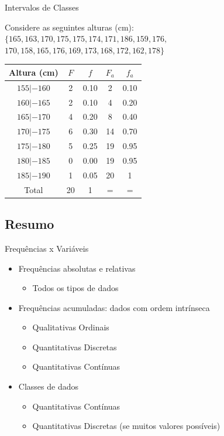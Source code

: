 \documentclass{beamer}
\begin{document}
\begin{frame}{Intervalos de Classes}

  Considere as seguintes alturas (cm):
$ \{ 165,163,170,175,175,174,171,186,159,176,$
$170,158,165,176,169,173,168,172,162,178 \} $

\centering\begin{tabular}{|c|c|c|c|c|}
  \hline
  Altura (cm) & $F$ & $f$ & $F_a$ & $f_a$ \\
  \hline
  $155 |- 160$ & 2 & 0.10 & 2 & 0.10\\%
  $160 |- 165$ & 2 & 0.10 & 4 & 0.20\\%
  $165 |- 170$ & 4 & 0.20 & 8 & 0.40\\%
  $170 |- 175$ & 6 & 0.30 & 14 & 0.70\\%
  $175 |- 180$ & 5 & 0.25 & 19 & 0.95\\%
  $180 |- 185$ & 0 & 0.00 & 19 & 0.95\\%
  $185 |- 190$ & 1 & 0.05 & 20 & 1\\%
  \hline
  \hline
  Total & 20 & 1 & = & =\\
  \hline
\end{tabular}

\end{frame}
\subsection{Resumo}

\begin{frame}{Frequências x Variáveis}
  \begin{itemize}
  \item Frequências absolutas e relativas
    \begin{itemize}
    \item Todos os tipos de dados
    \end{itemize}
  \item Frequências acumuladas: dados com ordem intrínseca
    \begin{itemize}
    \item Qualitativas Ordinais
    \item Quantitativas Discretas
    \item Quantitativas Contínuas
    \end{itemize}
  \item Classes de dados
    \begin{itemize}
    \item Quantitativas Contínuas
    \item Quantitativas Discretas (se muitos valores possíveis)
    \end{itemize}

  \end{itemize}
  
\end{frame}
\end{document}
